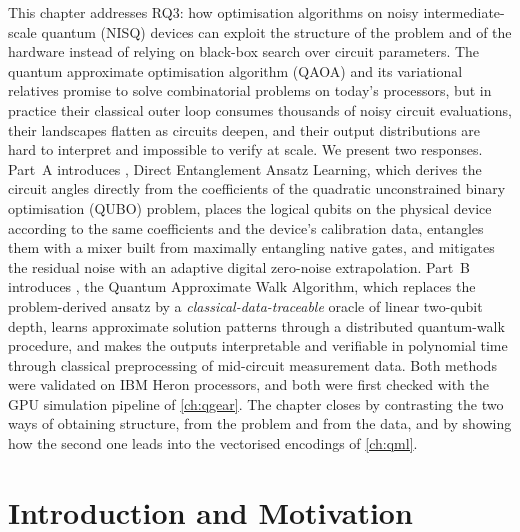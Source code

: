 This chapter addresses RQ3: how optimisation algorithms on noisy intermediate-scale quantum (NISQ) devices can exploit the structure of the problem and of the hardware instead of relying on black-box search over circuit parameters. The quantum approximate optimisation algorithm (QAOA) and its variational relatives promise to solve combinatorial problems on today's processors, but in practice their classical outer loop consumes thousands of noisy circuit evaluations, their landscapes flatten as circuits deepen, and their output distributions are hard to interpret and impossible to verify at scale. We present two responses. Part~A introduces \deal, Direct Entanglement Ansatz Learning, which derives the circuit angles directly from the coefficients of the quadratic unconstrained binary optimisation (QUBO) problem, places the logical qubits on the physical device according to the same coefficients and the device's calibration data, entangles them with a mixer built from maximally entangling native gates, and mitigates the residual noise with an adaptive digital zero-noise extrapolation. Part~B introduces \qawa, the Quantum Approximate Walk Algorithm, which replaces the problem-derived ansatz by a \emph{classical-data-traceable} oracle of linear two-qubit depth, learns approximate solution patterns through a distributed quantum-walk procedure, and makes the outputs interpretable and verifiable in polynomial time through classical preprocessing of mid-circuit measurement data. Both methods were validated on IBM Heron processors, and both were first checked with the GPU simulation pipeline of \cref{ch:qgear}. The chapter closes by contrasting the two ways of obtaining structure, from the problem and from the data, and by showing how the second one leads into the vectorised encodings of \cref{ch:qml}.

\section{Introduction and Motivation}\label{sec:nisq:intro}

